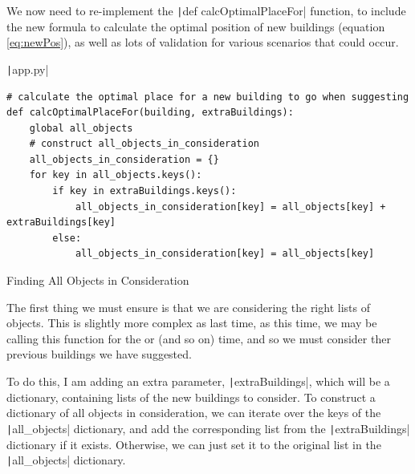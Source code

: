 \documentclass[12pt]{report}
\newcommand{\pil}[1]{\protect\texttt|#1|}
\begin{document}
\begin{center}
\end{center}

We now need to re-implement the \pil{def calcOptimalPlaceFor} function, to include the new formula to calculate the optimal position of new buildings (equation \ref{eq:newPos}), as well as lots of validation for various scenarios that could occur.

\begin{listing}[H]
\pil{app.py}
\begin{verbatim}
# calculate the optimal place for a new building to go when suggesting
def calcOptimalPlaceFor(building, extraBuildings):
    global all_objects
    # construct all_objects_in_consideration
    all_objects_in_consideration = {}
    for key in all_objects.keys():
        if key in extraBuildings.keys():
            all_objects_in_consideration[key] = all_objects[key] + extraBuildings[key]
        else:
            all_objects_in_consideration[key] = all_objects[key]
\end{verbatim}
\caption{Finding All Objects in Consideration}\label{cs:allObjectsInConsideration}
\end{listing}

The first thing we must ensure is that we are considering the right lists of objects. This is slightly more complex as last time, as this time, we may be calling this function for the  or  (and so on) time, and so we must consider ther previous buildings we have suggested.

To do this, I am adding an extra parameter, \pil{extraBuildings}, which will be a dictionary, containing lists of the new buildings to consider. To construct a dictionary of all objects in consideration, we can iterate over the keys of the \pil{all_objects} dictionary, and add the corresponding list from the \pil{extraBuildings} dictionary if it exists. Otherwise, we can just set it to the original list in the \pil{all_objects} dictionary.
\end{document}
